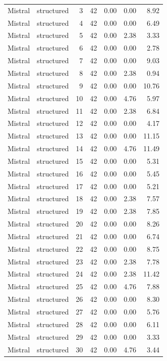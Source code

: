 \begin{longtable}{llrrrrr}
Mistral & structured & 3 & 42 & 0.00 & 0.00 & 8.92 \\
Mistral & structured & 4 & 42 & 0.00 & 0.00 & 6.49 \\
Mistral & structured & 5 & 42 & 0.00 & 2.38 & 3.33 \\
Mistral & structured & 6 & 42 & 0.00 & 0.00 & 2.78 \\
Mistral & structured & 7 & 42 & 0.00 & 0.00 & 9.03 \\
Mistral & structured & 8 & 42 & 0.00 & 2.38 & 0.94 \\
Mistral & structured & 9 & 42 & 0.00 & 0.00 & 10.76 \\
Mistral & structured & 10 & 42 & 0.00 & 4.76 & 5.97 \\
Mistral & structured & 11 & 42 & 0.00 & 2.38 & 6.84 \\
Mistral & structured & 12 & 42 & 0.00 & 0.00 & 4.17 \\
Mistral & structured & 13 & 42 & 0.00 & 0.00 & 11.15 \\
Mistral & structured & 14 & 42 & 0.00 & 4.76 & 11.49 \\
Mistral & structured & 15 & 42 & 0.00 & 0.00 & 5.31 \\
Mistral & structured & 16 & 42 & 0.00 & 0.00 & 5.45 \\
Mistral & structured & 17 & 42 & 0.00 & 0.00 & 5.21 \\
Mistral & structured & 18 & 42 & 0.00 & 2.38 & 7.57 \\
Mistral & structured & 19 & 42 & 0.00 & 2.38 & 7.85 \\
Mistral & structured & 20 & 42 & 0.00 & 0.00 & 8.26 \\
Mistral & structured & 21 & 42 & 0.00 & 0.00 & 6.74 \\
Mistral & structured & 22 & 42 & 0.00 & 0.00 & 8.75 \\
Mistral & structured & 23 & 42 & 0.00 & 2.38 & 7.78 \\
Mistral & structured & 24 & 42 & 0.00 & 2.38 & 11.42 \\
Mistral & structured & 25 & 42 & 0.00 & 4.76 & 7.88 \\
Mistral & structured & 26 & 42 & 0.00 & 0.00 & 8.30 \\
Mistral & structured & 27 & 42 & 0.00 & 0.00 & 5.76 \\
Mistral & structured & 28 & 42 & 0.00 & 0.00 & 6.11 \\
Mistral & structured & 29 & 42 & 0.00 & 0.00 & 3.33 \\
Mistral & structured & 30 & 42 & 0.00 & 4.76 & 3.44 \\

\end{longtable}
